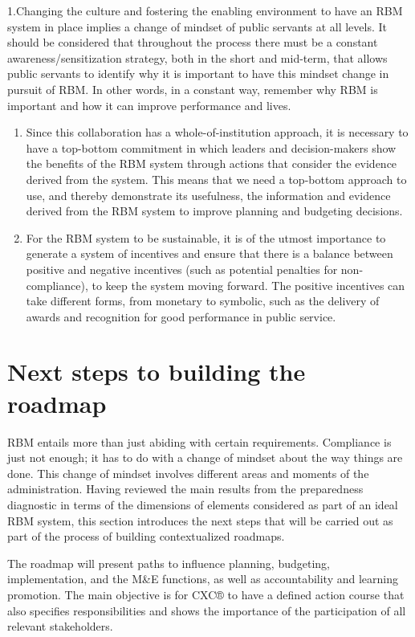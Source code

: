 \documentclass[
  10pt,
]{book}
\begin{document}
1.Changing the culture and fostering the enabling environment to have an RBM system in place implies a change of mindset of public servants at all levels. It should be considered that throughout the process there must be a constant awareness/sensitization strategy, both in the short and mid-term, that allows public servants to identify why it is important to have this mindset change in pursuit of RBM. In other words, in a constant way, remember why RBM is important and how it can improve performance and lives.

\begin{enumerate}
\def\labelenumi{\arabic{enumi}.}
\setcounter{enumi}{1}
\item
  Since this collaboration has a whole-of-institution approach, it is necessary to have a top-bottom commitment in which leaders and decision-makers show the benefits of the RBM system through actions that consider the evidence derived from the system. This means that we need a top-bottom approach to use, and thereby demonstrate its usefulness, the information and evidence derived from the RBM system to improve planning and budgeting decisions.
\item
  For the RBM system to be sustainable, it is of the utmost importance to generate a system of incentives and ensure that there is a balance between positive and negative incentives (such as potential penalties for non-compliance), to keep the system moving forward. The positive incentives can take different forms, from monetary to symbolic, such as the delivery of awards and recognition for good performance in public service.
\end{enumerate}

\hypertarget{section6}{%
\chapter{Next steps to building the roadmap}\label{section6}}

RBM entails more than just abiding with certain requirements. Compliance is just not enough; it has to do with a change of mindset about the way things are done. This change of mindset involves different areas and moments of the administration. Having reviewed the main results from the preparedness diagnostic in terms of the dimensions of elements considered as part of an ideal RBM system, this section introduces the next steps that will be carried out as part of the process of building contextualized roadmaps.

The roadmap will present paths to influence planning, budgeting, implementation, and the M\&E functions, as well as accountability and learning promotion. The main objective is for CXC® to have a defined action course that also specifies responsibilities and shows the importance of the participation of all relevant stakeholders.
\end{document}

